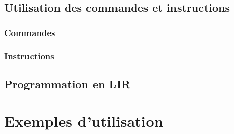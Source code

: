 \documentclass[11pt,a4paper,titlepage,openany,oneside]{book}
\begin{document}
        \section{Utilisation des commandes et instructions}
            

            \subsection{Commandes}
                

            \subsection{Instructions}
            

        \section{Programmation en LIR}
            

    \chapter{Exemples d'utilisation}
        
\end{document}
